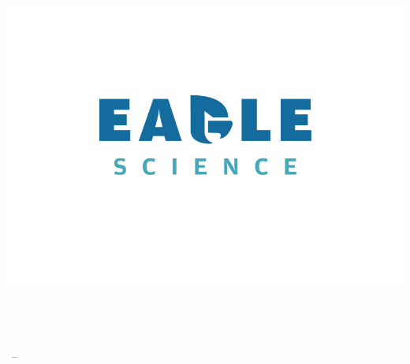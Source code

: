 
\begin{titlepage}

\begin{addmargin}[-1cm]{-3cm}
\begin{center}
\large

\hfill
\vfill

\begingroup
\color[HTML]{27406B}\spacedallcaps{\myTitle} \\ \bigskip %

\color[HTML]{84C6C8}\mySubtitle \\ \medskip
\endgroup

\spacedlowsmallcaps{\myName} %

\vfill

\includegraphics[width=15cm]{gfx/EagleScience_Logo_on_white} \\  %


\myworkName \\
\myworkAddress \\
\myworkPostcodeCity \\ \bigskip \bigskip \bigskip

\myTime\ -- \myVersion %

\vfill

\end{center}
\end{addmargin}

\end{titlepage}
